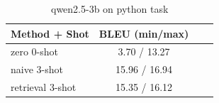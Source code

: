 \begin{table}[ht]
\centering
\small
\caption{qwen2.5-3b on python task}
\begin{tabular}{lccc}
\hline
Method + Shot & BLEU (min/max) \\
\hline
zero 0-shot & 3.70 / 13.27 \\
naive 3-shot & 15.96 / 16.94 \\
retrieval 3-shot & 15.35 / 16.12 \\
\hline
\end{tabular}
\end{table}
